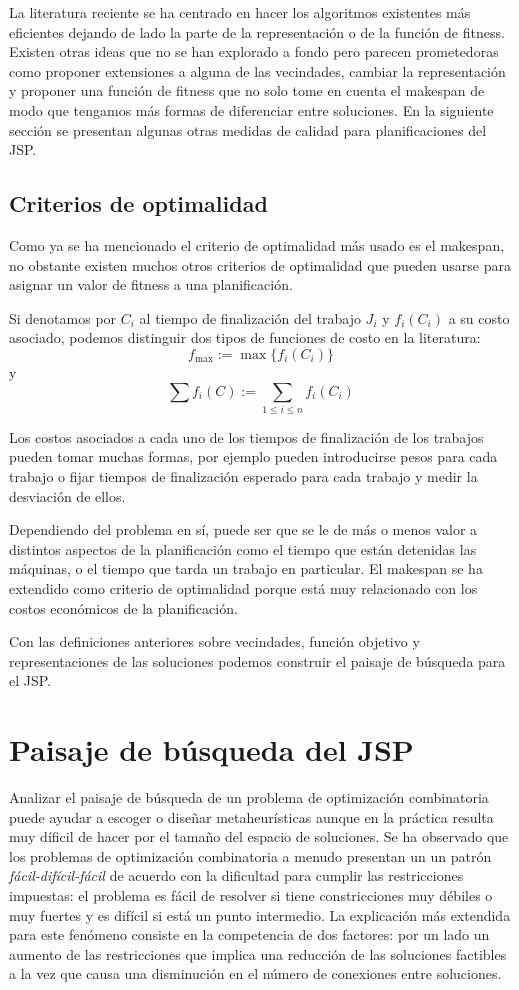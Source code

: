 La literatura reciente se ha centrado en hacer los algoritmos existentes más eficientes dejando de lado la parte de la representación o de la función de fitness. Existen otras ideas que no se han explorado a fondo pero parecen prometedoras como proponer extensiones a alguna de las vecindades, cambiar la representación y proponer una función de fitness que no solo tome en cuenta el makespan de modo que tengamos más formas de diferenciar entre soluciones. En la siguiente sección se presentan algunas otras medidas de calidad para planificaciones del JSP.
\subsection*{Criterios de optimalidad}
Como ya se ha mencionado el criterio de optimalidad más usado es el makespan, no obstante existen muchos otros criterios de optimalidad que pueden usarse para asignar un valor de fitness a una planificación. 

Si denotamos por $C_i$ al tiempo de finalización del trabajo $J_i$ y $f_i(C_i)$ a su costo asociado, podemos distinguir dos tipos de funciones de costo en la literatura\cite{Brucker2001}:
\[f_{\max}:=\max\{f_i(C_i)\}\]
y 
\[\sum f_i(C):=\sum_{1\leq i\leq n}f_i(C_i)\]

Los costos asociados a cada uno de los tiempos de finalización de los trabajos pueden tomar muchas formas, por ejemplo pueden introducirse pesos para cada trabajo o fijar tiempos de finalización esperado para cada trabajo y medir la desviación de ellos.

Dependiendo del problema en sí, puede ser que se le de más o menos valor a distintos aspectos de la planificación como el tiempo que están detenidas las máquinas, o el tiempo que tarda un trabajo en particular. El makespan se ha extendido como criterio de optimalidad porque está muy relacionado con los costos económicos de la planificación\cite{Rand1977}.


Con las definiciones anteriores sobre vecindades, función objetivo y representaciones de las soluciones podemos construir el paisaje de búsqueda para el JSP. 

\section{Paisaje de búsqueda del JSP}

Analizar el paisaje de búsqueda de un problema de optimización combinatoria puede ayudar a escoger o diseñar metaheurísticas aunque en la práctica resulta muy díficil de hacer por el tamaño del espacio de soluciones. Se ha observado que los problemas de optimización combinatoria a menudo presentan un un patrón \textit{fácil-difícil-fácil} \cite{mammen1997new} de acuerdo con la dificultad para cumplir las restricciones impuestas: el problema es fácil de resolver si tiene constricciones muy débiles o muy fuertes y es difícil si está un punto intermedio. La explicación más extendida para este fenómeno consiste en la competencia de dos factores: por un lado un aumento de las restricciones que implica una reducción de las soluciones factibles a la vez que causa una disminución en el número de conexiones entre soluciones.\\


